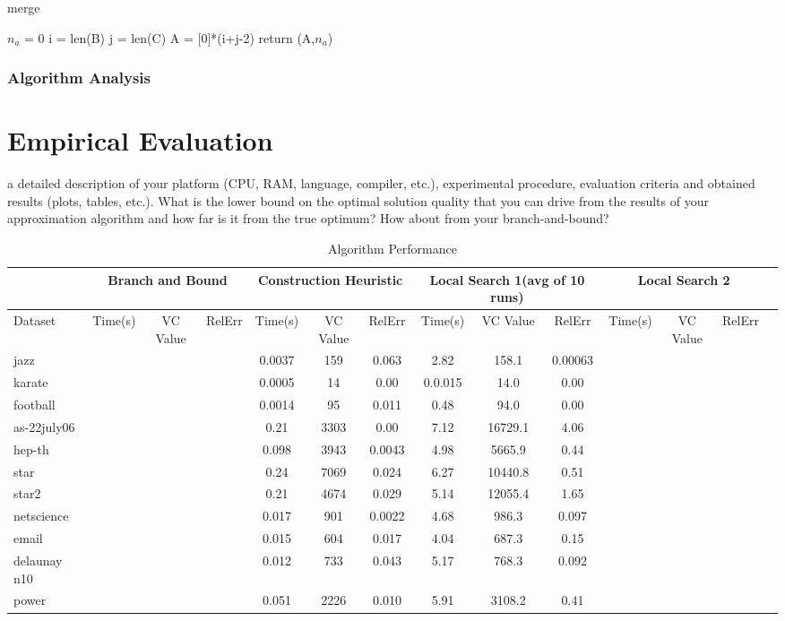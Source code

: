 \documentclass[acmlarge]{acmart}
\begin{document}
\begin{algorithm}[H]
	\caption{merge}
	\SetAlgoLined
	$n_a$ = 0\;
	i = len(B)\;
	j = len(C)\;
	A = [0]*(i+j-2)\;
	return (A,$n_a$)
\end{algorithm}

\subsubsection{Algorithm Analysis}

\lipsum[1]

\section{Empirical Evaluation}

a detailed description of your platform (CPU, RAM, language, compiler, etc.),
experimental procedure, evaluation criteria and obtained results (plots, tables, etc.). What is the
lower bound on the optimal solution quality that you can drive from the results of your approximation
algorithm and how far is it from the true optimum? How about from your branch-and-bound?

\begin{table}[H]
	\caption{Algorithm Performance}
	\label{tab:freq}
	\begin{tabular}{|l|c|c|c|c|c|c|c|c|c|c|c|c|c|}
		\toprule
		&\multicolumn{3}{c|}{Branch and Bound}&\multicolumn{3}{c|}{Construction Heuristic}&\multicolumn{3}{c|}{Local Search 1(avg of 10 runs)}&\multicolumn{3}{c|}{Local Search 2}\\
		\midrule
		Dataset&Time(s)&VC Value&RelErr&Time(s)&VC Value&RelErr&Time(s)&VC Value&RelErr&Time(s)&VC Value&RelErr&\\
		\midrule
		jazz&&&&0.0037&159&0.063&2.82&158.1&0.00063&&&\\
		karate&&&&0.0005&14&0.00&0.0.015&14.0&0.00&&&\\
		football&&&&0.0014&95&0.011&0.48&94.0&0.00&&&\\
		as-22july06&&&&0.21&3303&0.00&7.12&16729.1&4.06&&&\\
		hep-th&&&&0.098&3943&0.0043&4.98&5665.9&0.44&&&\\
		star&&&&0.24&7069&0.024&6.27&10440.8&0.51&&&\\
		star2&&&&0.21&4674&0.029&5.14&12055.4&1.65&&&\\
		netscience&&&&0.017&901&0.0022&4.68&986.3&0.097&&&\\
		email&&&&0.015&604&0.017&4.04&687.3&0.15&&&\\
		delaunay n10&&&&0.012&733&0.043&5.17&768.3&0.092&&&\\
		power&&&&0.051&2226&0.010&5.91&3108.2&0.41&&&\\
		\bottomrule
	\end{tabular}
\label{table:alg_perf}
\end{table}
\end{document}
